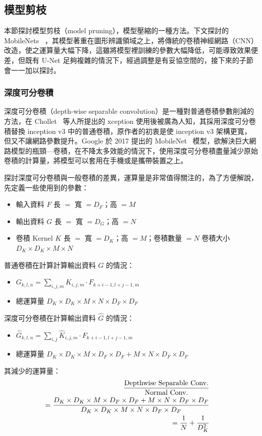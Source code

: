\subsection{模型剪枝}
本節探討模型剪枝（model pruning），模型壓縮的一種方法。下文探討的 MobileNets~\cite{howard2017mobilenets} ，其模型著重在圖形辨識領域之上，將傳統的卷積神經網路（CNN）改造，使之運算量大幅下降，這雖將模型裡訓練的參數大幅降低，可能導致效果便差，但既有 U-Net 足夠複雜的情況下，經過調整是有妥協空間的，接下來的子節會一一加以探討。

\subsubsection{深度可分卷積}
深度可分卷積（depth-wise separable convolution）是一種對普通卷積參數削減的方法，在 Chollet~\cite{chollet2017xception} 等人所提出的 xception 使用後被廣為人知，其採用深度可分卷積替換 inception v3 中的普通卷積，原作者的初衷是使 inception v3 架構更寬，但又不讓網路參數提升。Google 於 2017 提出的 MobileNet~\cite{howard2017mobilenets} 模型，欲解決巨大網路模型的瓶頸—卷積，在不降太多效能的情況下，使用深度可分卷積盡量減少原始卷積的計算量，將模型可以套用在手機或是攜帶裝置之上。

探討深度可分卷積與一般卷積的差異，運算量是非常值得關注的，為了方便解說，先定義一些使用到的參數：
\begin{itemize}
    \item 輸入資料 $F$
    \subitem 長 $=$ 寬 $=D_F$；高 $=M$
    \item 輸出資料 $G$
    \subitem 長 $=$ 寬 $=D_G$；高 $=N$
    \item 卷積 Kernel $K$
    \subitem 長 $=$ 寬 $=D_K$；高 $=M$；卷積數量 $=N$
    \subitem 卷積大小 $D_K \times D_K \times M \times N$
\end{itemize}
普通卷積在計算計算輸出資料 $G$ 的情況：
\begin{itemize}
    \item $G_{k,l,n}=\sum_{i,j,m}K_{i,j,m}\cdot F_{k+i-1,l+j-1,m}$
    \item 總運算量 $D_K \times D_K \times M \times N \times D_F \times D_F$
\end{itemize}
深度可分卷積在計算輸出資料 $\hat{G}$ 的情況：
\begin{itemize}
    \item $\hat{G}_{k,l,n}=\sum_{i,j}\hat{K}_{i,j,m}\cdot F_{k+i-1,l+j-1,m}$
    \item 總運算量 $D_K \times D_K \times M \times D_F \times D_F + M \times N \times D_F \times D_F$
\end{itemize}
其減少的運算量：
\begin{equation*}
\begin{split}
    \frac{\textup{Depthwise Separable Conv.}}{\textup{Normal Conv.}} \\
    = \frac{D_K \times D_K \times M \times D_F \times D_F + M \times N \times D_F \times D_F}{D_K \times D_K \times M \times N \times D_F \times D_F} \\
    = \frac{1}{N} + \frac{1}{D_K^2} &
\end{split}
\end{equation*}

